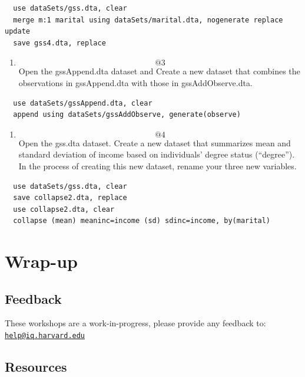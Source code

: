 \documentclass[]{book}
\providecommand{\tightlist}{%
  \setlength{\itemsep}{0pt}\setlength{\parskip}{0pt}}
\begin{document}
\begin{verbatim}
  use dataSets/gss.dta, clear
  merge m:1 marital using dataSets/marital.dta, nogenerate replace update
  save gss4.dta, replace
\end{verbatim}

\begin{enumerate}
\def\labelenumi{\arabic{enumi}.}
\setcounter{enumi}{2}
\tightlist
\item
  \[@3\] Open the gssAppend.dta dataset and Create a new dataset that
  combines the observations in gssAppend.dta with those in
  gssAddObserve.dta.
\end{enumerate}

\begin{verbatim}
  use dataSets/gssAppend.dta, clear
  append using dataSets/gssAddObserve, generate(observe) 
\end{verbatim}

\begin{enumerate}
\def\labelenumi{\arabic{enumi}.}
\setcounter{enumi}{3}
\tightlist
\item
  \[@4\] Open the gss.dta dataset. Create a new dataset that summarizes
  mean and standard deviation of income based on individuals' degree
  status (``degree''). In the process of creating this new dataset,
  rename your three new variables.
\end{enumerate}

\begin{verbatim}
  use dataSets/gss.dta, clear
  save collapse2.dta, replace
  use collapse2.dta, clear
  collapse (mean) meaninc=income (sd) sdinc=income, by(marital)
\end{verbatim}

\section{Wrap-up}\label{wrap-up-8}

\subsection{Feedback}\label{feedback-8}

These workshops are a work-in-progress, please provide any feedback to:
\href{mailto:help@iq.harvard.edu}{\nolinkurl{help@iq.harvard.edu}}

\subsection{Resources}\label{resources-8}
\end{document}
